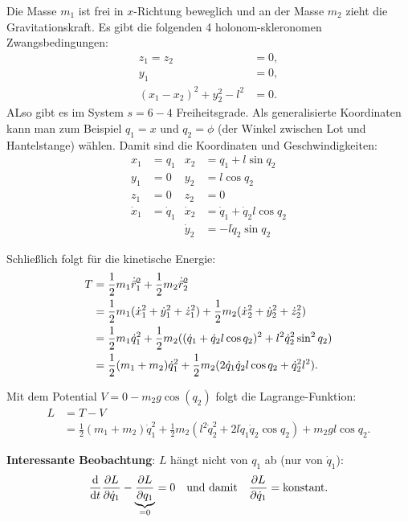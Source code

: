 \begin{beispiel*}
	Die Masse $m_1$ ist frei in $x$-Richtung beweglich und an der Masse $m_2$ zieht die Gravitationskraft.
	Es gibt die folgenden 4 holonom-skleronomen Zwangsbedingungen:
	\begin{align*}
	z_1 = z_2 &= 0, \\
	y_1 &= 0, \\
	(x_1 - x_2)^2 + y_2^2 - l^2 &= 0 \text{.}
	\end{align*}
	ALso gibt es im System $s = 6 - 4$ Freiheitsgrade.
	Als generalisierte Koordinaten kann man zum Beispiel $q_1 = x$ und $q_2 = \phi$ (der Winkel zwischen Lot und Hantelstange) wählen. Damit sind die Koordinaten und Geschwindigkeiten:
	\begin{align*}
	x_1 &= q_1 & x_2 &= q_1 + l \sin q_2\\
	y_1 &= 0 & y_2 &= l \cos q_2\\
	z_1 &= 0 & z_2 &= 0\\
	\dot{x}_1 &= \dot{q}_1 & \dot{x}_2 &= \dot{q}_1 + \dot{q}_2 l \cos q_2\\
	&&\dot{y}_2 &= - l \dot{q}_2 \sin q_2
	\end{align*}
	
	Schließlich folgt für die kinetische Energie:
	\begin{align*}
	T & = \frac12 m_1 \dot{\vec{r}}^2_1 + \frac12 m_2 \dot{\vec{r}}^2_2 \\
	&= \frac12 m_1 (\dot{x}_1^2 + \dot{y}_1^2 + \dot{z}_1^2) + \frac12 m_2 (\dot{x}_2^2 + \dot{y}_2^2 + \dot{z}_2^2) \\
	&= \frac12 m_1 \dot{q}_1^2 + \frac12 m_2 ( (\dot{q}_1 + \dot{q}_2 l \cos q_2)^2 + l^2 \dot{q}_2^2 \sin^2 q_2) \\
	&= \frac12 (m_1 + m_2) \dot{q}_1^2 + \frac12 m_2 (2 \dot{q}_1 \dot{q}_2 l \cos q_2 + \dot{q}_2^2 l^2) 
	\text{.}
	\end{align*}
	
	Mit dem Potential $V = 0 - m_2 g \cos(q_2)$ folgt die Lagrange-Funktion:
	\begin{align*}
		L &= T - V \\
		&= \frac12 (m_1 + m_2) \dot{q}_1^2 + \frac12 m_2 (l^2 \dot{q}_2^2 + 2 l \dot{q}_1 \dot{q}_2 \cos q_2) + m_2 g l \cos q_2
		\text{.}
	\end{align*}
	
	\textbf{Interessante Beobachtung}: $L$ hängt nicht von $q_1$ ab (nur von $\dot{q}_1$):
	\[
	\frac{\mathrm d}{\mathrm d t} \frac{\partial L}{\partial \dot{q}_1} - \underbrace{\frac{\partial L}{\partial q_1}}_{= 0} = 0
	\quad \text{und damit} \quad 	
	\frac{\partial L}{\partial \dot{q}_1} = \text{konstant}
	\text{.}
	\]
\end{beispiel*}

